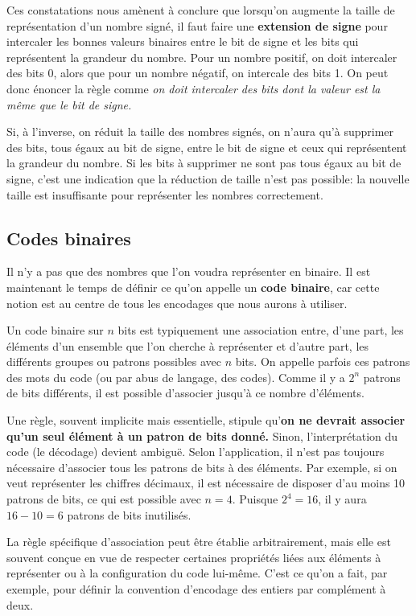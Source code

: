 \documentclass[11pt]{article}
\begin{document}
Ces constatations nous amènent à conclure que lorsqu'on augmente la
taille de représentation d'un nombre signé, il faut faire une
\textbf{extension de signe} pour intercaler les bonnes valeurs binaires entre
le bit de signe et les bits qui représentent la grandeur du
nombre. Pour un nombre positif, on doit intercaler des bits 0, alors
que pour un nombre négatif, on intercale des bits 1. On peut donc
énoncer la règle comme \emph{on doit intercaler des bits dont la valeur est
la même que le bit de signe.}

Si, à l'inverse, on réduit la taille des nombres signés, on n'aura
qu'à supprimer des bits, tous égaux au bit de signe, entre le bit de
signe et ceux qui représentent la grandeur du nombre. Si les bits à
supprimer ne sont pas tous égaux au bit de signe, c'est une indication
que la réduction de taille n'est pas possible: la nouvelle taille est
insuffisante pour représenter les nombres correctement.


\subsection{Codes binaires}
\label{sec:orgd851f59}

Il n'y a pas que des nombres que l'on voudra représenter en
binaire. Il est maintenant le temps de définir ce qu'on appelle un
\textbf{code binaire}, car cette notion est au centre de tous les encodages
que nous aurons à utiliser.

Un code binaire sur \(n\) bits est typiquement une association entre,
d'une part, les éléments d'un ensemble que l'on cherche à représenter
et d'autre part, les différents groupes ou patrons possibles avec
\(n\) bits. On appelle parfois ces patrons des mots du code (ou par abus
de langage, des codes). Comme il y a \(2^n\) patrons de bits
différents, il est possible d'associer jusqu'à ce nombre
d'éléments.

Une règle, souvent implicite mais essentielle, stipule qu'\textbf{on
ne devrait associer qu'un seul élément à un patron de bits donné.}
Sinon, l'interprétation du code (le décodage) devient ambiguë. Selon
l'application, il n'est pas toujours nécessaire d'associer tous les
patrons de bits à des éléments. Par exemple, si on veut représenter
les chiffres décimaux, il est nécessaire de disposer d'au moins 10
patrons de bits, ce qui est possible avec \(n=4\). Puisque \(2^4 =
16\), il y aura \(16 - 10 = 6\) patrons de bits inutilisés.

La règle spécifique d'association peut être établie arbitrairement,
mais elle est souvent conçue en vue de respecter certaines propriétés
liées aux éléments à représenter ou à la configuration du code
lui-même. C'est ce qu'on a fait, par exemple, pour définir la
convention d'encodage des entiers par complément à deux.
\end{document}
